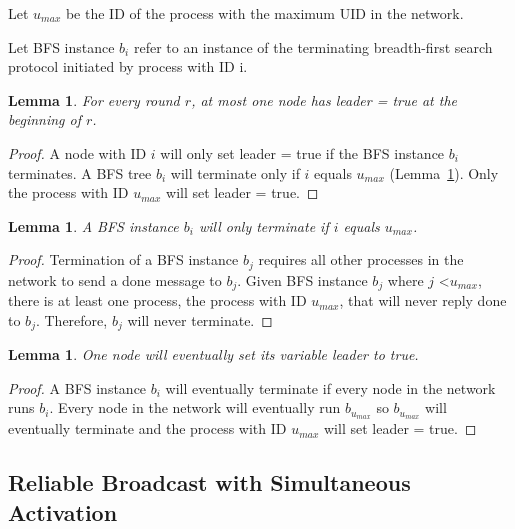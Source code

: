 \documentclass[english]{article}
\newtheorem{lemma}[theorem]{Lemma}
\begin{document}
\begin{definition}
Let $u_{max}$ be the ID of the process with the maximum UID in the network. 
\end{definition}

\begin{definition}
Let BFS instance $b_i$ refer to an instance of the terminating breadth-first search protocol initiated by process with ID i.
\end{definition}

\begin{lemma}
\label{LESafetyStatic}
For every round $r$, at most one node has leader = true at the beginning of $r$.
\end{lemma}
\begin{proof}
A node with ID $i$ will only set leader = true if the BFS instance $b_i$ terminates.
A BFS tree $b_i$ will terminate only if $i$ equals $u_{max}$ (Lemma~\ref{BFSTermination}).
Only the process with ID $u_{max}$ will set leader = true. 
\end{proof}

\begin{lemma}
\label{BFSTermination}
  A BFS instance $b_i$ will only terminate if $i$ equals $u_{max}$.
\end{lemma}

\begin{proof}
Termination of a BFS instance $b_j$ requires all other processes in the network to send a done message to $b_j$.
Given BFS instance $b_j$ where $j$ \textless $u_{max}$, there is at least one process, the process with ID $u_{max}$, that will never reply done to $b_j$.
Therefore, $b_j$ will never terminate.
\end{proof}

\begin{lemma}
\label{LELivenessStatic}
  One node will eventually set its variable leader to true.
\end{lemma}
\begin{proof}
A BFS instance $b_i$ will eventually terminate if every node in the network runs $b_i$. 
Every node in the network will eventually run $b_{u_{max}}$ so $b_{u_{max}}$ will eventually terminate and the process with ID $u_{max}$ will set leader = true.
\end{proof}



\subsection {Reliable Broadcast with Simultaneous Activation}
\end{document}
